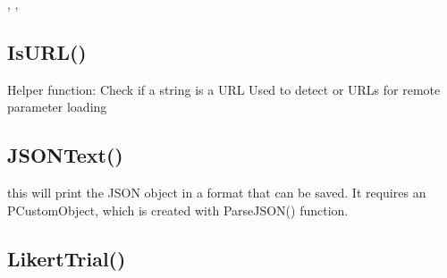 \documentclass[letterpaper,10pt,english]{sphinxmanual}
\begin{document}
\sphinxAtStartPar
{}

\sphinxAtStartPar
{}, , 

\ignorespaces 

\subsection{IsURL()}
\label{\detokenize{reference/utility:isurl}}\label{\detokenize{reference/utility:index-22}}
\sphinxAtStartPar
{}

\sphinxAtStartPar
Helper function: Check if a string is a URL
Used to detect  or  URLs for remote parameter loading

\sphinxAtStartPar
{}

\begin{sphinxVerbatim}[commandchars=\\\{\}]
\end{sphinxVerbatim}

\ignorespaces 

\subsection{JSONText()}
\label{\detokenize{reference/utility:jsontext}}\label{\detokenize{reference/utility:index-23}}
\sphinxAtStartPar
{}

\sphinxAtStartPar
this will print the JSON object in a format that can be saved.
It requires an PCustomObject, which is created with ParseJSON() function.

\sphinxAtStartPar
{}

\begin{sphinxVerbatim}[commandchars=\\\{\}]
\end{sphinxVerbatim}

\ignorespaces 

\subsection{LikertTrial()}
\label{\detokenize{reference/utility:likerttrial}}\label{\detokenize{reference/utility:index-24}}
\sphinxAtStartPar
{}
\end{document}

